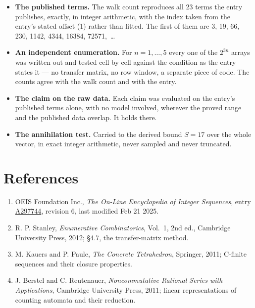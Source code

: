 \documentclass[11pt]{article}
\theoremstyle{definition}
\begin{document}
\begin{itemize}

\item {\bfseries The published terms.} The walk count reproduces all 23 terms the entry publishes, exactly, in integer arithmetic, with the index taken from the entry's stated offset (1) rather than fitted. The first of them are 3, 19, 66, 230, 1142, 4344, 16384, 72571,~\dots

\item {\bfseries An independent enumeration.} For $n = 1,\dots,5$ every one of the $2^{3n}$ arrays was written out and tested cell by cell against the condition as the entry states it --- no transfer matrix, no row window, a separate piece of code. The counts agree with the walk count and with the entry.

\item {\bfseries The claim on the raw data.} Each claim was evaluated on the entry's published terms alone, with no model involved, wherever the proved range and the published data overlap. It holds there.

\item {\bfseries The annihilation test.} Carried to the derived bound $S = 17$ over the whole vector, in exact integer arithmetic, never sampled and never truncated.

\end{itemize}

\section{References}

\begin{enumerate}

\item OEIS Foundation Inc., \emph{The On-Line Encyclopedia of Integer Sequences}, entry \href{https://oeis.org/A297744}{A297744}, revision 6, last modified Feb 21 2025.

\item R. P. Stanley, \emph{Enumerative Combinatorics}, Vol.~1, 2nd ed., Cambridge University Press, 2012; \S4.7, the transfer-matrix method.

\item M. Kauers and P. Paule, \emph{The Concrete Tetrahedron}, Springer, 2011; C-finite sequences and their closure properties.

\item J. Berstel and C. Reutenauer, \emph{Noncommutative Rational Series with Applications}, Cambridge University Press, 2011; linear representations of counting automata and their reduction.

\end{enumerate}
\end{document}
